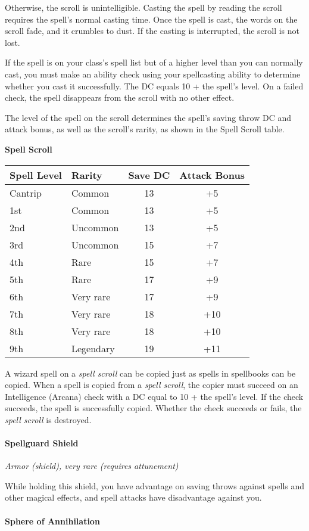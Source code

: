 \documentclass[
]{article}
\begin{document}
Otherwise, the scroll is unintelligible. Casting the spell by reading
the scroll requires the spell's normal casting time. Once the spell is
cast, the words on the scroll fade, and it crumbles to dust. If the
casting is interrupted, the scroll is not lost.

If the spell is on your class's spell list but of a higher level than
you can normally cast, you must make an ability check using your
spellcasting ability to determine whether you cast it successfully. The
DC equals 10 + the spell's level. On a failed check, the spell
disappears from the scroll with no other effect.

The level of the spell on the scroll determines the spell's saving throw
DC and attack bonus, as well as the scroll's rarity, as shown in the
Spell Scroll table.

\textbf{Spell Scroll}

\begin{longtable}[]{@{}llcc@{}}
\toprule
Spell Level & Rarity & Save DC & Attack Bonus\tabularnewline
\midrule
\endhead
Cantrip & Common & 13 & +5\tabularnewline
1st & Common & 13 & +5\tabularnewline
2nd & Uncommon & 13 & +5\tabularnewline
3rd & Uncommon & 15 & +7\tabularnewline
4th & Rare & 15 & +7\tabularnewline
5th & Rare & 17 & +9\tabularnewline
6th & Very rare & 17 & +9\tabularnewline
7th & Very rare & 18 & +10\tabularnewline
8th & Very rare & 18 & +10\tabularnewline
9th & Legendary & 19 & +11\tabularnewline
\bottomrule
\end{longtable}

A wizard spell on a \emph{spell scroll} can be copied just as spells in
spellbooks can be copied. When a spell is copied from a \emph{spell
scroll}, the copier must succeed on an Intelligence (Arcana) check with
a DC equal to 10 + the spell's level. If the check succeeds, the spell
is successfully copied. Whether the check succeeds or fails, the
\emph{spell scroll} is destroyed.

\hypertarget{spellguard-shield}{%
\paragraph{Spellguard Shield}\label{spellguard-shield}}

\emph{Armor (shield), very rare (requires attunement)}

While holding this shield, you have advantage on saving throws against
spells and other magical effects, and spell attacks have disadvantage
against you.

\hypertarget{sphere-of-annihilation}{%
\paragraph{Sphere of Annihilation}\label{sphere-of-annihilation}}
\end{document}
